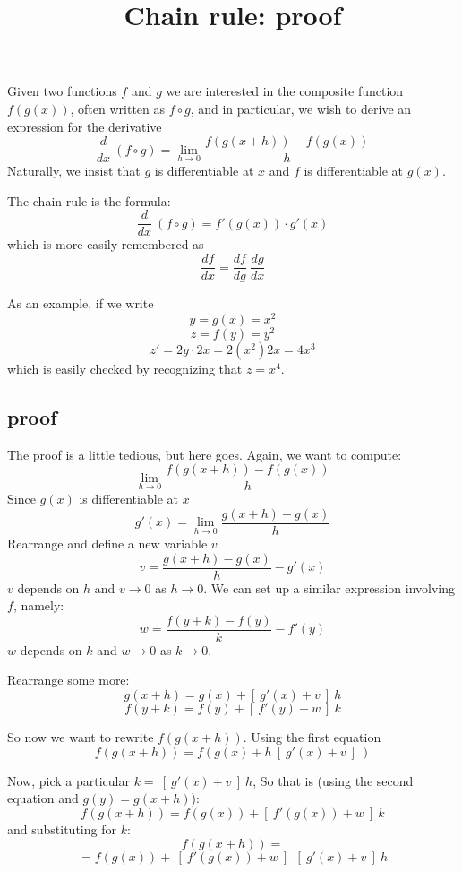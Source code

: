 \documentclass[11pt, oneside]{article}   	%
\title{Chain rule:  proof}
\date{}							%
\begin{document}
\maketitle
\Large
\noindent
Given two functions $f$ and $g$ we are interested in the composite function $f(g(x))$, often written as $f \circ g$, and in particular, we wish to derive an expression for the derivative
\[ \frac{d}{dx} \ (f \circ g) = \lim_{h \rightarrow 0} \frac{f(g(x+h)) - f(g(x))}{h} \]
Naturally, we insist that $g$ is differentiable at $x$ and $f$ is differentiable at $g(x)$.

The chain rule is the formula:
\[ \frac{d}{dx} \ (f \circ g) = f'(g(x)) \cdot g'(x) \]
which is more easily remembered as
\[ \frac{df}{dx} = \frac{df}{dg} \ \frac{dg}{dx} \]

As an example, if we write
\[ y = g(x) = x^2 \]
\[ z = f(y) = y^2 \]
\[ z' = 2y \cdot 2x = 2(x^2) 2 x = 4 x^3 \]
which is easily checked by recognizing that $z = x^4$.
\subsection*{proof}
The proof is a little tedious, but here goes.  Again, we want to compute:
\[ \lim_{h \rightarrow 0} \frac{f(g(x+h)) - f(g(x))}{h} \]
Since $g(x)$ is differentiable at $x$
\[ g'(x) = \lim_{h \rightarrow 0} \frac{g(x+h) - g(x)}{h} \]
Rearrange and define a new variable $v$
\[ v = \frac{g(x+h) - g(x)}{h} - g'(x) \]
$v$ depends on $h$ and $v \rightarrow 0$ as $h \rightarrow 0$.  We can set up a similar expression involving $f$, namely:
\[ w = \frac{f(y+k) - f(y)}{k} - f'(y) \]
$w$ depends on $k$ and $w \rightarrow 0$ as $k \rightarrow 0$.

Rearrange some more:
\[ g(x+h) = g(x) + [ \ g'(x) + v \ ] \ h \]
\[ f(y+k) = f(y) + [ \ f'(y) + w \ ] \ k \]

So now we want to rewrite $f(g(x+h))$.  Using the first equation
\[ f(g(x+h)) = f( g(x) + h \ [ \ g'(x) + v \ ] \ ) \]

Now, pick a particular $k = \ [ \ g'(x) + v \ ] \ h$, So that is (using the second equation and $g(y) = g(x+h)$):
\[ f(g(x+h)) = f(g(x)) + [ \ f'(g(x)) + w \ ] \ k  \]
and substituting for $k$:
\[ f(g(x+h)) = \]
\[ = f(g(x)) + \ [ \ f'(g(x)) + w \ ] \ \ [ \ g'(x) + v \ ] \ h \]
\end{document}
